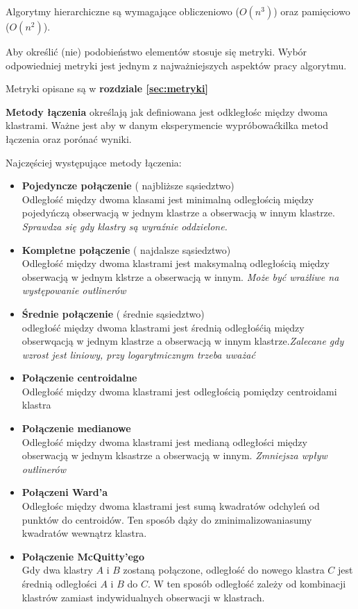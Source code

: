 Algorytmy hierarchiczne są wymagające obliczeniowo ($O(n^3)$) oraz pamięciowo ($O(n^2)$).

Aby określić (nie) podobieństwo elementów stosuje się metryki. Wybór odpowiedniej metryki jest jednym z najważniejszych aspektów pracy algorytmu. 

Metryki opisane są w \textbf{rozdziale \ref{sec:metryki}}

\textbf{Metody łączenia} określają jak definiowana jest odkległośc między dwoma klastrami. Ważne jest aby w danym eksperymencie wypróbowaćkilka metod łączenia  oraz porónać wyniki. 

Najczęściej występujące metody łączenia:

\begin{itemize}
    \item \textbf{Pojedyncze połączenie} ( najbliższe sąsiedztwo) \\ Odległość między dwoma klasami jest minimalną odległością między pojedyńczą obserwacją w jednym klastrze a obserwacją w innym klastrze. \textit{Sprawdza się gdy klastry są wyraźnie oddzielone.}
    \item \textbf{Kompletne połączenie} ( najdalsze sąsiedztwo) \\ Odległość między dwoma klastrami jest maksymalną odległością między obserwacją w jednym klstrze a obserwacją w innym. \textit{Może być wrażliwe na występowanie outlinerów}
    \item \textbf{Średnie połączenie} ( średnie sąsiedztwo) \\ odległość między dwoma klastrami jest średnią odległośćią między obserwqacją w jednym klastrze a obserwacją w innym klastrze.\textit{Zalecane gdy wzrost jest liniowy, przy logarytmicznym trzeba uważać}
    \item \textbf{Połączenie centroidalne}\\ Odległość między dwoma klastrami jest odległością pomiędzy centroidami klastra
    \item \textbf{Połączenie medianowe}\\ Odległość między dwoma klastrami jest medianą odległości między obserwacją w jednym klsastrze a obserwacją w innym. \textit{Zmniejsza wpływ outlinerów}
    \item \textbf{Połączeni Ward'a} \\ Odległośc między dwoma klastrami jest sumą kwadratów odchyleń od punktów do centroidów. Ten sposób dąży do zminimalizowaniasumy kwadratów wewnątrz klastra.
    \item \textbf{Połączenie McQuitty'ego} \\ Gdy dwa klastry $A$ i $B$ zostaną połączone, odległość do nowego klastra $C$ jest średnią  odległości $A$ i $B$ do $C$. W ten sposób odległość zależy od kombinacji klastrów zamiast indywidualnych obserwacji w klastrach.
\end{itemize}